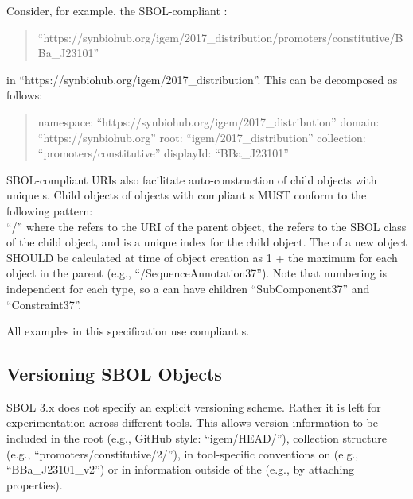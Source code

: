 Consider, for example, the SBOL-compliant :
\begin{quote}``https://synbiohub.org/igem/2017\_distribution/promoters/constitutive/BBa\_J23101''\end{quote} 
in  ``https://synbiohub.org/igem/2017\_distribution''.
This  can be decomposed as follows:
\begin{quote} 
namespace: ``https://synbiohub.org/igem/2017\_distribution'' \linebreak
domain: ``https://synbiohub.org'' \linebreak
root: ``igem/2017\_distribution'' \linebreak
collection: ``promoters/constitutive'' \linebreak
displayId: ``BBa\_J23101'' \linebreak
\end{quote}

SBOL-compliant URIs also facilitate auto-construction of child objects with unique s. 
Child objects of  objects with compliant s MUST conform to the following pattern:\\ ``/'' where the  refers to the URI of the parent object, the  refers to the SBOL class of the child object, and  is a unique index for the child object. 
The  of a new object SHOULD be calculated at time of object creation as 1 + the maximum  for each  object in the parent (e.g., ``/SequenceAnnotation37''). 
Note that numbering is independent for each type, so a  can have children ``SubComponent37'' and ``Constraint37''.

All examples in this specification use compliant s.

\subsection{Versioning SBOL Objects}

SBOL 3.x does not specify an explicit versioning scheme. Rather it is left for experimentation across different tools. This allows version information to be included in the root (e.g., GitHub style: ``igem/HEAD/''), collection structure (e.g., ``promoters/constitutive/2/''), in tool-specific conventions on  (e.g., ``BBa\_J23101\_v2'') or in information outside of the  (e.g., by attaching  properties).

